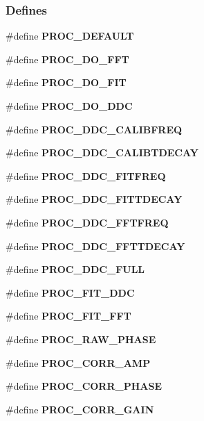 \subsubsection*{Defines}
\begin{CompactItemize}
\item 
\#define {\bf PROC\_\-DEFAULT}
\item 
\#define \textbf{PROC\_\-DO\_\-FFT}\label{group__processing_g7753a1dae883290ad0e5ba65147e9f13}

\item 
\#define \textbf{PROC\_\-DO\_\-FIT}\label{group__processing_gf546dfa71990db7bf7eeec36d8d60a59}

\item 
\#define \textbf{PROC\_\-DO\_\-DDC}\label{group__processing_g6c2a8696b49c25e4f29252c3a6d6ac3a}

\item 
\#define \textbf{PROC\_\-DDC\_\-CALIBFREQ}\label{group__processing_g21955fd76a7620b71f44fdd66356e04b}

\item 
\#define \textbf{PROC\_\-DDC\_\-CALIBTDECAY}\label{group__processing_gca7f027c67eaec7448bb5df686b7b0d4}

\item 
\#define \textbf{PROC\_\-DDC\_\-FITFREQ}\label{group__processing_g5730568b109a13eb72680a14857dbbb9}

\item 
\#define \textbf{PROC\_\-DDC\_\-FITTDECAY}\label{group__processing_ga79556cfe04c3b7c9c039fa1f277c901}

\item 
\#define \textbf{PROC\_\-DDC\_\-FFTFREQ}\label{group__processing_g9eb43ef7c8ecd8d8f728efde9ba522a2}

\item 
\#define \textbf{PROC\_\-DDC\_\-FFTTDECAY}\label{group__processing_g516ea3a0590d5902fe107655b03db0c8}

\item 
\#define \textbf{PROC\_\-DDC\_\-FULL}\label{group__processing_g1bfa87418a15d7f7e87d6b479c1dcb55}

\item 
\#define \textbf{PROC\_\-FIT\_\-DDC}\label{group__processing_ga2774a6d8a9ea83cc4121e385f8e20ec}

\item 
\#define \textbf{PROC\_\-FIT\_\-FFT}\label{group__processing_gbe1a2c0c3d7c8f256d3f3b2df2ade610}

\item 
\#define \textbf{PROC\_\-RAW\_\-PHASE}\label{group__processing_g1b4ba11635f5e3ec0ae70b6eaa858725}

\item 
\#define \textbf{PROC\_\-CORR\_\-AMP}\label{group__processing_gd634d8b142407b14b2ed1784764025c0}

\item 
\#define \textbf{PROC\_\-CORR\_\-PHASE}\label{group__processing_gd99c4784aba9a6afaa18896c5736d60c}

\item 
\#define \textbf{PROC\_\-CORR\_\-GAIN}\label{group__processing_g40fc552f6d97737b3521d75173f86597}

\end{CompactItemize}
